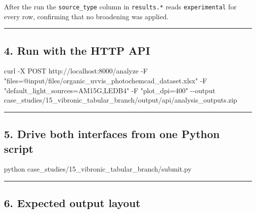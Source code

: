 \documentclass[
  11pt,
]{article}
\newenvironment{Shaded}{}{}
\newcommand{\AttributeTok}[1]{\textcolor[rgb]{0.49,0.56,0.16}{#1}}
\newcommand{\ExtensionTok}[1]{#1}
\newcommand{\NormalTok}[1]{#1}
\newcommand{\StringTok}[1]{\textcolor[rgb]{0.25,0.44,0.63}{#1}}
\begin{document}
After the run the \texttt{source\_type} column in \texttt{results.*}
reads \texttt{experimental} for every row, confirming that no broadening
was applied.

\begin{center}\rule{0.5\linewidth}{0.5pt}\end{center}

\hypertarget{4-run-with-the-http-api}{
\subsection{4. Run with the HTTP API}\label{4-run-with-the-http-api}}

\begin{Shaded}
\begin{Highlighting}[]
\ExtensionTok{curl} \AttributeTok{{-}X}\NormalTok{ POST http://localhost:8000/analyze }\AttributeTok{{-}F} \StringTok{"files=@input/files/organic\_uvvis\_photochemcad\_dataset.xlsx"} \AttributeTok{{-}F} \StringTok{"default\_light\_sources=AM15G,LEDB4"} \AttributeTok{{-}F} \StringTok{"plot\_dpi=400"} \AttributeTok{{-}{-}output}\NormalTok{ case\_studies/15\_vibronic\_tabular\_branch/output/api/analysis\_outputs.zip}
\end{Highlighting}
\end{Shaded}

\begin{center}\rule{0.5\linewidth}{0.5pt}\end{center}

\hypertarget{5-drive-both-interfaces-from-one-python-script}{
\subsection{5. Drive both interfaces from one Python
script}\label{5-drive-both-interfaces-from-one-python-script}}

\begin{Shaded}
\begin{Highlighting}[]
\ExtensionTok{python}\NormalTok{ case\_studies/15\_vibronic\_tabular\_branch/submit.py}
\end{Highlighting}
\end{Shaded}

\begin{center}\rule{0.5\linewidth}{0.5pt}\end{center}

\hypertarget{6-expected-output-layout}{
\subsection{6. Expected output layout}\label{6-expected-output-layout}}
\end{document}
